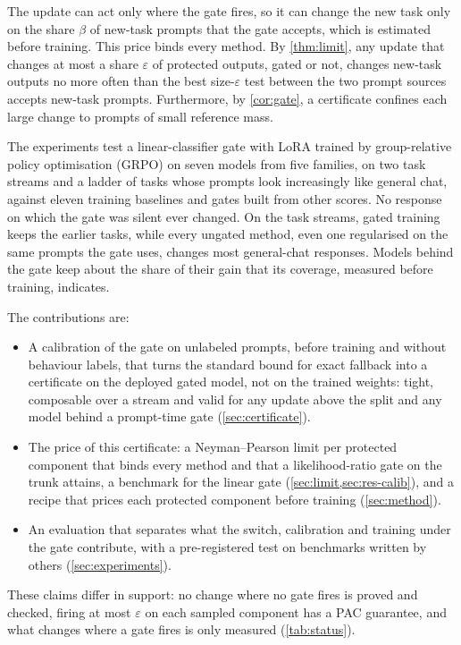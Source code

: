 \documentclass{article}
\theoremstyle{plain}
\theoremstyle{definition}
\theoremstyle{remark}
\begin{document}
The update can act only where the gate fires, so it can change the new task only on the share $\beta$ of new-task prompts that the gate accepts, which is estimated before training. This price binds every method. By \cref{thm:limit}, any update that changes at most a share $\varepsilon$ of protected outputs, gated or not, changes new-task outputs no more often than the best size-$\varepsilon$ test between the two prompt sources accepts new-task prompts. Furthermore, by \cref{cor:gate}, a certificate confines each large change to prompts of small reference mass.

The experiments test a linear-classifier gate with LoRA \citep{hu2022lora} trained by group-relative policy optimisation (GRPO) \citep{shao2024deepseekmath} on seven models from five families, on two task streams and a ladder of tasks whose prompts look increasingly like general chat, against eleven training baselines and gates built from other scores. No response on which the gate was silent ever changed. On the task streams, gated training keeps the earlier tasks, while every ungated method, even one regularised on the same prompts the gate uses, changes most general-chat responses. Models behind the gate keep about the share of their gain that its coverage, measured before training, indicates.

The contributions are:
\begin{itemize}
    \item A calibration of the gate on unlabeled prompts, before training and without behaviour labels, that turns
the standard bound for exact fallback into a certificate on the deployed gated model, not on the trained weights:
tight, composable over a stream and valid for any update above the split and any model behind a prompt-time gate
(\cref{sec:certificate}).
\item The price of this certificate: a Neyman--Pearson limit per protected
component that binds every method and that a likelihood-ratio gate on the trunk attains, a benchmark for the linear gate (\cref{sec:limit,sec:res-calib}), and a
recipe that prices each protected component before training (\cref{sec:method}).
\item An evaluation that separates what the
switch, calibration and training under the gate contribute, with a pre-registered test on benchmarks written by others (\cref{sec:experiments}).
\end{itemize}
These claims differ in support: no change where no gate fires is proved and checked,
firing at most $\varepsilon$ on each sampled component has a PAC guarantee, and what changes where a gate fires
is only measured (\cref{tab:status}).
\end{document}
